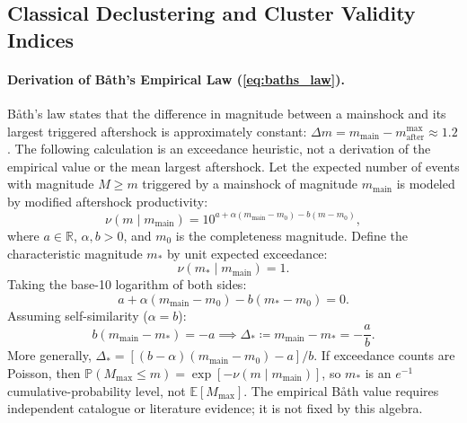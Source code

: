 \subsection{Classical Declustering and Cluster Validity Indices}
\label{subsec:supp_classical_metrics}

\paragraph{Derivation of B\r{a}th's Empirical Law (\cref{eq:baths_law}).}
B\r{a}th's law states that the difference in magnitude between a mainshock
and its largest triggered aftershock is approximately constant:
$\Delta m = m_{\mathrm{main}} - m_{\mathrm{after}}^{\max} \approx 1.2$.
The following calculation is an exceedance heuristic, not a derivation of
the empirical value or the mean largest aftershock. Let the expected
number of events
with magnitude $M \ge m$ triggered by a mainshock of magnitude
$m_{\mathrm{main}}$
is modeled by modified aftershock productivity:
\begin{equation}
  \nu(m \mid m_{\mathrm{main}}) = 10^{a + \alpha(m_{\mathrm{main}} -
  m_0) - b(m - m_0)},
  \label{eq:supp_gr_productivity}
\end{equation}
where $a\in\mathbb{R}$, $\alpha,b>0$, and $m_0$ is the completeness
magnitude. Define the characteristic magnitude $m_*$ by unit
expected exceedance:
\begin{equation}
  \nu(m_* \mid m_{\mathrm{main}}) = 1.
  \label{eq:supp_extreme_value_condition}
\end{equation}
Taking the base-10 logarithm of both sides:
\begin{equation}
  a + \alpha(m_{\mathrm{main}} - m_0) - b(m_* - m_0) = 0.
\end{equation}
Assuming self-similarity ($\alpha = b$):
\begin{equation}
  b(m_{\mathrm{main}} - m_*) = -a \implies
  \Delta_* \coloneqq m_{\mathrm{main}} - m_* =
  -\frac{a}{b}.
  \label{eq:supp_baths_ratio}
\end{equation}
More generally, $\Delta_*=[(b-\alpha)(m_{\mathrm{main}}-m_0)-a]/b$.
If exceedance counts are Poisson, then
$\mathbb{P}(M_{\max}\le m)=\exp[-\nu(m\mid m_{\mathrm{main}})]$,
so $m_*$ is an $e^{-1}$ cumulative-probability level, not
$\mathbb{E}[M_{\max}]$. The empirical B\r{a}th value requires independent
catalogue or literature evidence; it is not fixed by this algebra.

